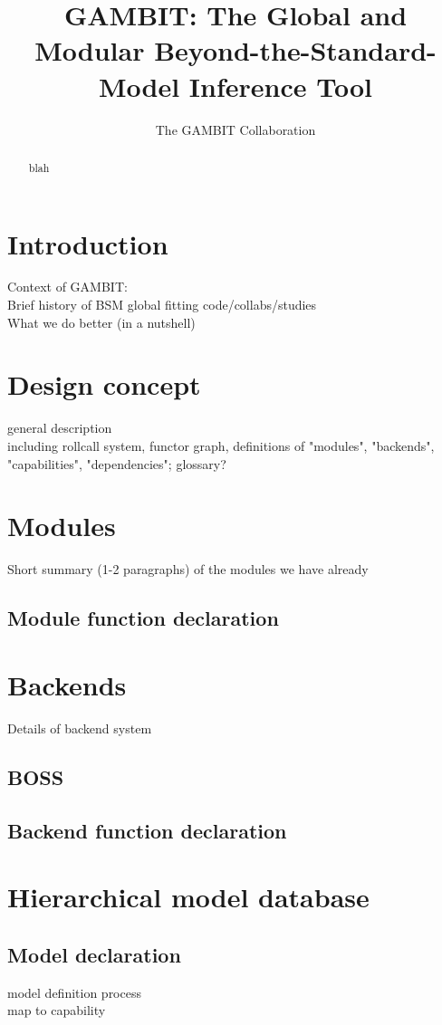 \documentclass[11pt,a4paper]{article}
\title{GAMBIT: The Global and Modular Beyond-the-Standard-Model Inference Tool}
\author{The GAMBIT Collaboration}
\begin{document}
\maketitle

\begin{abstract}
blah
\end{abstract}

\section{Introduction}
Context of GAMBIT:\\
Brief history of BSM global fitting code/collabs/studies\\
What we do better (in a nutshell)

\section{Design concept}
general description\\
including rollcall system, functor graph, definitions of "modules", "backends", "capabilities", "dependencies"; glossary?

\section{Modules}
Short summary (1-2 paragraphs) of the modules we have already
\subsection{Module function declaration}

\section{Backends}
Details of backend system
\subsection{BOSS}
\subsection{Backend function declaration}

\section{Hierarchical model database}
\subsection{Model declaration}
model definition process\\
map to capability
\end{document}
